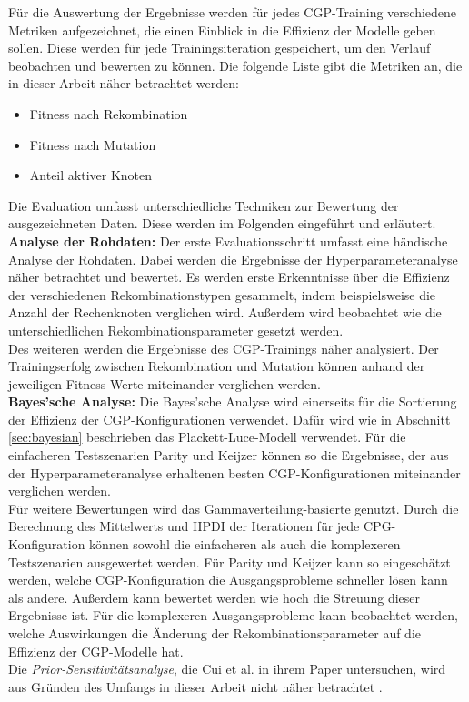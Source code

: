 Für die Auswertung der Ergebnisse werden für jedes CGP-Training verschiedene Metriken aufgezeichnet, die einen Einblick in die Effizienz der Modelle geben sollen.
Diese werden für jede Trainingsiteration gespeichert, um den Verlauf beobachten und bewerten zu können.
Die folgende Liste gibt die Metriken an, die in dieser Arbeit näher betrachtet werden:
\begin{itemize}
	\item Fitness nach Rekombination
	\item Fitness nach Mutation
	\item Anteil aktiver Knoten
\end{itemize}

Die Evaluation umfasst unterschiedliche Techniken zur Bewertung der ausgezeichneten Daten.
Diese werden im Folgenden eingeführt und erläutert.\\

\textbf{Analyse der Rohdaten:} Der erste Evaluationsschritt umfasst eine händische Analyse der Rohdaten.
Dabei werden die Ergebnisse der Hyperparameteranalyse näher betrachtet und bewertet.
Es werden erste Erkenntnisse über die Effizienz der verschiedenen Rekombinationstypen gesammelt, indem beispielsweise die Anzahl der Rechenknoten verglichen wird.
Außerdem wird beobachtet wie die unterschiedlichen Rekombinationsparameter gesetzt werden.\\
Des weiteren werden die Ergebnisse des CGP-Trainings näher analysiert.
Der Trainingserfolg zwischen Rekombination und Mutation können anhand der jeweiligen Fitness-Werte miteinander verglichen werden.\\

\textbf{Bayes'sche Analyse:} Die Bayes'sche Analyse wird einerseits für die Sortierung der Effizienz der CGP-Konfigurationen verwendet. 
Dafür wird wie in Abschnitt \ref{sec:bayesian} beschrieben das Plackett-Luce-Modell verwendet.
Für die einfacheren Testszenarien Parity und Keijzer können so die Ergebnisse, der aus der Hyperparameteranalyse erhaltenen besten CGP-Konfigurationen miteinander verglichen werden.\\
Für weitere Bewertungen wird das Gammaverteilung-basierte genutzt.
Durch die Berechnung des Mittelwerts und HPDI der Iterationen für jede CPG-Konfiguration können sowohl die einfacheren als auch die komplexeren Testszenarien ausgewertet werden.
Für Parity und Keijzer kann so eingeschätzt werden, welche CGP-Konfiguration die Ausgangsprobleme schneller lösen kann als andere.
Außerdem kann bewertet werden wie hoch die Streuung dieser Ergebnisse ist.
Für die komplexeren Ausgangsprobleme kann beobachtet werden, welche Auswirkungen die Änderung der Rekombinationsparameter auf die Effizienz der CGP-Modelle hat.\\
Die \emph{Prior-Sensitivitätsanalyse}, die Cui et al. in ihrem Paper untersuchen, wird aus Gründen des Umfangs in dieser Arbeit nicht näher betrachtet \cite{cui_equidistant_2023}.\\

